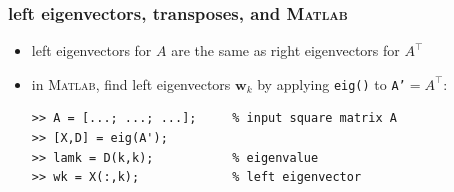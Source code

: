 \documentclass[10pt,dvipsnames,usepdftitle=false,
hyperref={pdftitle = {Finite volume methods},
    pdfauthor = {Ed Bueler}}]{beamer}
\newcommand{\bw}{\mathbf{w}}
\newcommand{\Matlab}{\textsc{Matlab}\xspace}
\begin{document}

\begin{frame}[fragile]
\frametitle{left eigenvectors, transposes, and \Matlab}

\begin{itemize}
\item left eigenvectors for $A$ are the same as right eigenvectors for $A^\top$
\item in \Matlab, find left eigenvectors $\bw_k$ by applying \texttt{eig()} to \texttt{A'}$=A^\top$:
\begin{Verbatim}[fontsize=\small]
>> A = [...; ...; ...];     % input square matrix A
>> [X,D] = eig(A');
>> lamk = D(k,k);           % eigenvalue
>> wk = X(:,k);             % left eigenvector
\end{Verbatim}
\end{itemize}
\end{frame}
\end{document}
